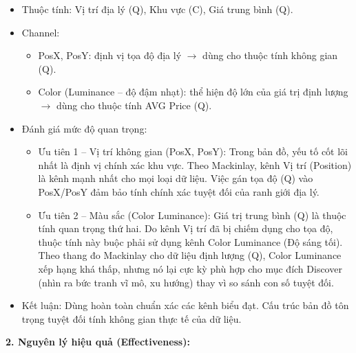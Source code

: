 \begin{itemize}
    \item Thuộc tính: Vị trí địa lý (Q), Khu vực (C), Giá trung bình (Q).
    \item Channel:
    \begin{itemize}
        \item PosX, PosY: định vị tọa độ địa lý $\rightarrow$ dùng cho thuộc tính không gian (Q).
        \item Color (Luminance -- độ đậm nhạt): thể hiện độ lớn của giá trị định lượng $\rightarrow$ dùng cho thuộc tính AVG Price (Q).
    \end{itemize}
    \item Đánh giá mức độ quan trọng:
    \begin{itemize}
        \item Ưu tiên 1 -- Vị trí không gian (PosX, PosY): Trong bản đồ, yếu tố cốt lõi nhất là định vị chính xác khu vực. Theo Mackinlay, kênh Vị trí (Position) là kênh mạnh nhất cho mọi loại dữ liệu. Việc gán tọa độ (Q) vào PosX/PosY đảm bảo tính chính xác tuyệt đối của ranh giới địa lý.
        \item Ưu tiên 2 -- Màu sắc (Color Luminance): Giá trị trung bình (Q) là thuộc tính quan trọng thứ hai. Do kênh Vị trí đã bị chiếm dụng cho tọa độ, thuộc tính này buộc phải sử dụng kênh Color Luminance (Độ sáng tối). Theo thang đo Mackinlay cho dữ liệu định lượng (Q), Color Luminance xếp hạng khá thấp, nhưng nó lại cực kỳ phù hợp cho mục đích Discover (nhìn ra bức tranh vĩ mô, xu hướng) thay vì so sánh con số tuyệt đối.
    \end{itemize}
    \item Kết luận: Dùng hoàn toàn chuẩn xác các kênh biểu đạt. Cấu trúc bản đồ tôn trọng tuyệt đối tính không gian thực tế của dữ liệu.
\end{itemize}

\textbf{2. Nguyên lý hiệu quả (Effectiveness):}

